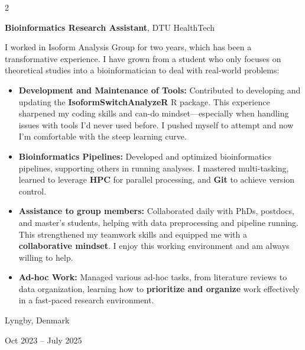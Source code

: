 \documentclass[10pt, letterpaper]{article}
\newenvironment{highlights}{
    \begin{itemize}[
        topsep=0.10 cm,
        parsep=0.10 cm,
        partopsep=0pt,
        itemsep=0pt,
        leftmargin=0.4 cm + 10pt
    ]
}{
    \end{itemize}
} %
\newenvironment{twocolentry}[2][]{
    \onecolentry
    \def\secondColumn{#2}
    \setcolumnwidth{\fill, 4.5 cm}
    \begin{paracol}{2}
}{
    \switchcolumn \raggedleft \secondColumn
    \end{paracol}
    \endonecolentry
} %
\begin{document}
        
        \begin{twocolentry}{
    Lyngby, Denmark

    Oct 2023 –  July 2025
}
    \textbf{Bioinformatics Research Assistant}, DTU HealthTech

    \vspace{0.1cm}
    
     I worked in Isoform Analysis Group for two years, which has been a transformative experience. I have grown from a student who only focuses on theoretical studies into a bioinformatician to deal with real-world problems:

    \begin{highlights}
        \item \textbf{Development and Maintenance of Tools:} Contributed to developing and updating the \textbf{IsoformSwitchAnalyzeR} R package. This experience sharpened my coding skills and can-do mindset—especially when handling issues with tools I'd never used before. I pushed myself to attempt and now I'm comfortable with the steep learning curve. 

        \vspace{0.1cm}

        \item \textbf{Bioinformatics Pipelines:} Developed and optimized bioinformatics pipelines, supporting others in running analyses. I mastered multi-tasking, learned to leverage \textbf{HPC} for parallel processing, and \textbf{Git} to achieve version control.

        \vspace{0.1cm}

        \item \textbf{Assistance to group members:} Collaborated daily with PhDs, postdocs, and master's students, helping with data preprocessing and pipeline running. This strengthened my teamwork skills and equipped me with a \textbf{ collaborative mindset}. I enjoy this working environment and am always willing to help.

        \vspace{0.1cm}

        \item \textbf{Ad-hoc Work:} Managed various ad-hoc tasks, from literature reviews to data organization, learning how to \textbf{prioritize and organize} work effectively in a fast-paced research environment.
    \end{highlights}
\end{twocolentry}
\end{document}
